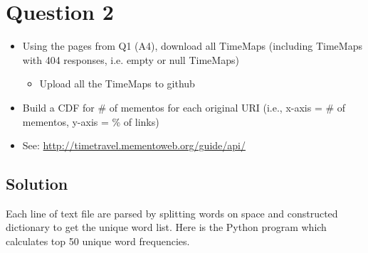
\section{Question 2}
\label{part2}
\begin{itemize} 
\item Using the pages from Q1 (A4), download all TimeMaps (including TimeMaps with 404 responses, i.e. empty or null TimeMaps) 
\begin{itemize}
\item Upload all the TimeMaps to github
\end{itemize}

\item Build a CDF for \# of mementos for each original URI (i.e., x-axis = \# of mementos, y-axis = \% of links)
\item See: \url {http://timetravel.mementoweb.org/guide/api/} 

\end{itemize}
\subsection{Solution}

Each line of text file are parsed by splitting words on space and constructed dictionary to get the unique word list.
Here is the Python program which calculates top 50 unique word frequencies.

%
\newpage
